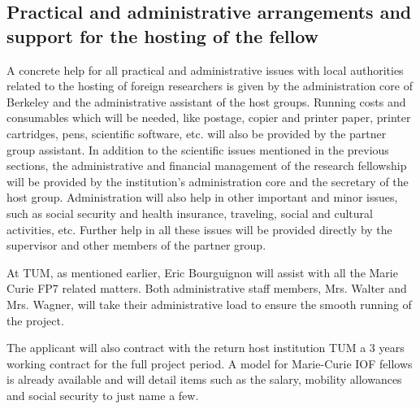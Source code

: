 \newpage
\subsection{Practical and administrative arrangements and support for the hosting of the fellow 
} 
A concrete help for all practical and administrative issues with local authorities related to 
the hosting of foreign researchers is given by the administration core of Berkeley and the 
administrative assistant of the host groups. Running costs and consumables which will be needed, like 
postage, copier and printer paper, printer cartridges, pens, scientific software, etc. will 
also be provided by the partner group assistant. 
In addition to the scientific issues mentioned in the previous sections, the administrative 
and financial management of the research fellowship will be provided by the institution's 
administration core and the secretary of the host group. Administration will also help in 
other important and minor issues, such as social security and health insurance, traveling, 
social and cultural activities, etc. Further help in all these issues will be provided directly 
by the supervisor and other members of the partner group.

At TUM, as mentioned earlier, Eric Bourguignon  will assist with all the
Marie Curie FP7 related matters. Both  administrative staff members, Mrs. Walter and
Mrs. Wagner, will take their administrative load  to ensure the smooth running of the
project.

The applicant will also contract with the return host institution TUM a 3 years working 
contract for the full project period. A model for Marie-Curie IOF fellows is already available 
and will detail items such as the salary, mobility allowances and social security to just name a few.
\newpage
